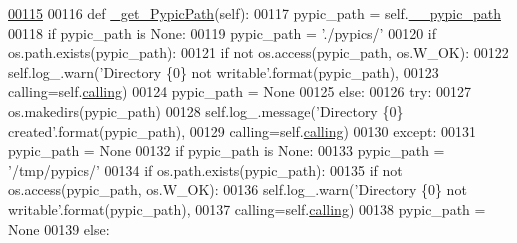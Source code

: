 \begin{DoxyCode}
\hypertarget{classpyneb_1_1utils_1_1_config_1_1___config_l00115}{}\hyperlink{classpyneb_1_1utils_1_1_config_1_1___config_a7767dbcdc10faca7e175f2778970a416}{00115} 
00116     \textcolor{keyword}{def }\hyperlink{classpyneb_1_1utils_1_1_config_1_1___config_a7767dbcdc10faca7e175f2778970a416}{\_get\_PypicPath}(self):
00117         pypic\_path = self.\hyperlink{classpyneb_1_1utils_1_1_config_1_1___config_a1c122165aa8885ce11f9bf86d08c40cd}{\_\_pypic\_path}
00118         \textcolor{keywordflow}{if} pypic\_path \textcolor{keywordflow}{is} \textcolor{keywordtype}{None}:
00119             pypic\_path = \textcolor{stringliteral}{'./pypics/'}
00120             \textcolor{keywordflow}{if} os.path.exists(pypic\_path):
00121                 \textcolor{keywordflow}{if} \textcolor{keywordflow}{not} os.access(pypic\_path, os.W\_OK):
00122                     self.log\_.warn(\textcolor{stringliteral}{'Directory \{0\} not writable'}.format(pypic\_path),
00123                                       calling=self.\hyperlink{classpyneb_1_1utils_1_1_config_1_1___config_abf04542e5670abea107260ca7a6baf6d}{calling})
00124                     pypic\_path = \textcolor{keywordtype}{None}
00125             \textcolor{keywordflow}{else}:
00126                 \textcolor{keywordflow}{try}:
00127                     os.makedirs(pypic\_path)
00128                     self.log\_.message(\textcolor{stringliteral}{'Directory \{0\} created'}.format(pypic\_path),
00129                                       calling=self.\hyperlink{classpyneb_1_1utils_1_1_config_1_1___config_abf04542e5670abea107260ca7a6baf6d}{calling})
00130                 \textcolor{keywordflow}{except}:
00131                     pypic\_path = \textcolor{keywordtype}{None}
00132             \textcolor{keywordflow}{if} pypic\_path \textcolor{keywordflow}{is} \textcolor{keywordtype}{None}:
00133                 pypic\_path = \textcolor{stringliteral}{'/tmp/pypics/'}
00134                 \textcolor{keywordflow}{if} os.path.exists(pypic\_path):
00135                     \textcolor{keywordflow}{if} \textcolor{keywordflow}{not} os.access(pypic\_path, os.W\_OK):
00136                         self.log\_.warn(\textcolor{stringliteral}{'Directory \{0\} not writable'}.format(pypic\_path),
00137                                           calling=self.\hyperlink{classpyneb_1_1utils_1_1_config_1_1___config_abf04542e5670abea107260ca7a6baf6d}{calling})                                   
00138                         pypic\_path = \textcolor{keywordtype}{None} 
00139                 \textcolor{keywordflow}{else}:

\end{DoxyCode}

